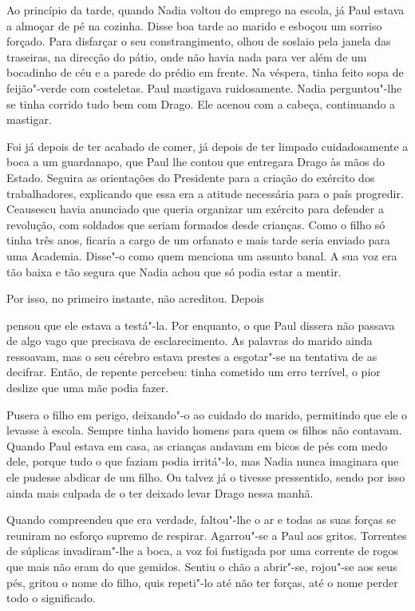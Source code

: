 Ao princípio da tarde, quando Nadia voltou do emprego na escola, já Paul
estava a almoçar de pé na cozinha. Disse boa tarde ao marido e esboçou
um sorriso forçado. Para disfarçar o seu constrangimento, olhou de
soslaio pela janela das traseiras, na direcção do pátio, onde não havia
nada para ver além de um bocadinho de céu e a parede do prédio em
frente. Na véspera, tinha feito sopa de feijão"-verde com costeletas. Paul mastigava ruidosamente. Nadia perguntou"-lhe
se tinha corrido tudo bem com Drago. Ele acenou com a cabeça,
continuando a mastigar.

Foi já depois de ter acabado de comer, já depois de ter limpado
cuidadosamente a boca a um guardanapo, que Paul lhe contou que entregara
Drago às mãos do Estado. Seguira as orientações do Presidente para a
criação do exército dos trabalhadores, explicando que essa era a atitude necessária para o país progredir. Ceausescu havia anunciado que
queria organizar um exército para defender a revolução, com soldados que
seriam formados desde crianças. Como o filho só tinha três anos, ficaria
a cargo de um orfanato e mais tarde seria enviado para uma Academia.
Disse"-o como quem menciona um assunto banal. A sua voz era tão baixa e
tão segura que Nadia achou que só podia estar a mentir.

Por isso, no primeiro instante, não acreditou. Depois

pensou que ele estava a testá"-la. Por enquanto, o que Paul dissera não
passava de algo vago que precisava de esclarecimento. As palavras do
marido ainda ressoavam, mas o seu cérebro estava prestes a esgotar"-se na
tentativa de as decifrar. Então, de repente percebeu: tinha cometido um
erro terrível, o pior deslize que uma mãe podia fazer.

Pusera o filho em perigo, deixando"-o ao cuidado do marido, permitindo
que ele o levasse à escola. Sempre tinha havido homens para quem os
filhos não contavam. Quando Paul estava em casa, as crianças andavam em
bicos de pés com medo dele, porque tudo o que faziam podia irritá"-lo,
mas Nadia nunca imaginara que ele pudesse abdicar de um filho. Ou talvez
já o tivesse pressentido, sendo por isso ainda mais culpada de o ter
deixado levar Drago nessa manhã.

Quando compreendeu que era verdade, faltou"-lhe o ar e todas as suas
forças se reuniram no esforço supremo de respirar. Agarrou"-se a Paul aos
gritos. Torrentes de súplicas invadiram"-lhe a boca, a voz foi fustigada
por uma corrente de rogos que mais não eram do que gemidos. Sentiu o
chão a abrir"-se, rojou"-se aos seus pés, gritou o nome do filho, quis
repeti"-lo até não ter forças, até o nome perder todo o significado.

